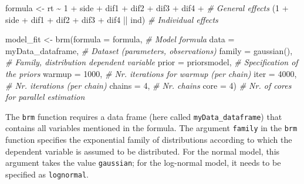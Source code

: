 \documentclass[
  english,
  doc,floatsintext]{apa6}
\newenvironment{Shaded}{\begin{snugshade}}{\end{snugshade}}
\newcommand{\AttributeTok}[1]{\textcolor[rgb]{0.77,0.63,0.00}{#1}}
\newcommand{\CommentTok}[1]{\textcolor[rgb]{0.56,0.35,0.01}{\textit{#1}}}
\newcommand{\DecValTok}[1]{\textcolor[rgb]{0.00,0.00,0.81}{#1}}
\newcommand{\FunctionTok}[1]{\textcolor[rgb]{0.00,0.00,0.00}{#1}}
\newcommand{\NormalTok}[1]{#1}
\newcommand{\OtherTok}[1]{\textcolor[rgb]{0.56,0.35,0.01}{#1}}
\newcommand{\SpecialCharTok}[1]{\textcolor[rgb]{0.00,0.00,0.00}{#1}}
\begin{document}
\begin{Shaded}
\begin{Highlighting}[]
\NormalTok{formula }\OtherTok{\textless{}{-}}\NormalTok{ rt }\SpecialCharTok{\textasciitilde{}} \DecValTok{1} \SpecialCharTok{+}\NormalTok{ side }\SpecialCharTok{+}\NormalTok{ dif1 }\SpecialCharTok{+}\NormalTok{ dif2 }\SpecialCharTok{+}\NormalTok{ dif3 }\SpecialCharTok{+}\NormalTok{ dif4 }\SpecialCharTok{+}   \CommentTok{\# General effects }
\NormalTok{          (}\DecValTok{1} \SpecialCharTok{+}\NormalTok{ side }\SpecialCharTok{+}\NormalTok{ dif1 }\SpecialCharTok{+}\NormalTok{ dif2 }\SpecialCharTok{+}\NormalTok{ dif3 }\SpecialCharTok{+}\NormalTok{ dif4 }\SpecialCharTok{||}\NormalTok{ ind)  }\CommentTok{\# Individual effects }

\NormalTok{model\_fit }\OtherTok{\textless{}{-}} \FunctionTok{brm}\NormalTok{(}\AttributeTok{formula =}\NormalTok{ formula,                      }\CommentTok{\# Model formula }
                 \AttributeTok{data =}\NormalTok{ myData\_dataframe,                }\CommentTok{\# Dataset (parameters, observations) }
                 \AttributeTok{family =} \FunctionTok{gaussian}\NormalTok{(),                    }\CommentTok{\# Family, distribution dependent variable }
                 \AttributeTok{prior =}\NormalTok{ priorsmodel,                    }\CommentTok{\# Specification of the priors }
                 \AttributeTok{warmup =} \DecValTok{1000}\NormalTok{,                          }\CommentTok{\# Nr. iterations for warmup (per chain)}
                 \AttributeTok{iter =} \DecValTok{4000}\NormalTok{,                            }\CommentTok{\# Nr. iterations (per chain)}
                 \AttributeTok{chains =} \DecValTok{4}\NormalTok{,                             }\CommentTok{\# Nr. chains }
                 \AttributeTok{core =} \DecValTok{4}\NormalTok{)                               }\CommentTok{\# Nr. of cores for parallel estimation}
\end{Highlighting}
\end{Shaded}

\normalsize The \texttt{brm} function requires a data frame (here called \texttt{myData\_dataframe}) that contains all variables mentioned in the formula. The argument \texttt{family} in the \texttt{brm} function specifies the exponential family of distributions according to which the dependent variable is assumed to be distributed. For the normal model, this argument takes the value \texttt{gaussian}; for the log-normal model, it needs to be specified as \texttt{lognormal}.
\end{document}
